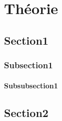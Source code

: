 \chapter{Théorie}
\section{Section1}
\subsection{Subsection1}
\subsubsection{Subsubsection1}
\lipsum[1-3]
\section{Section2}
\lipsum
